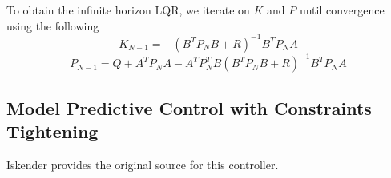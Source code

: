 \documentclass{article}
\begin{document}
To obtain the infinite horizon LQR, we iterate on $K$ and $P$ until convergence using the following
$$K_{N-1} = - (B^T P_{N} B + R)^{-1} B^T P_{N} A $$
$$P_{N-1} = Q + A^T P_{N} A - A^T P_{N}^T B(B^T P_{N} B + R)^{-1} B^T P_{N} A$$

\subsection{Model Predictive Control with Constraints Tightening}
Iskender \cite{2018_Iskender} provides the original source for this controller.

\printbibliography
\end{document}
